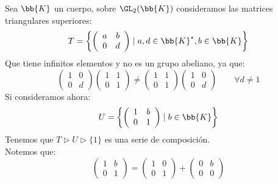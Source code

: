 \begin{ejemplo}
    Sea $\bb{K}$ un cuerpo, sobre $\GL_2(\bb{K})$ consideramos las matrices triangulares superiores:
    \begin{equation*}
        T = \left\{\left(\begin{array}{cc}
            a & b \\
            0 & d 
        \end{array}\right) \mid a,d\in \bb{K}^\ast, b\in \bb{K}\right\}
    \end{equation*}
    Que tiene infinitos elementos y no es un grupo abeliano, ya que:
    \begin{equation*}
        \left(\begin{array}{cc}
            1 & 0 \\
            0 & d 
        \end{array}\right)\left(\begin{array}{cc}
            1 & 1 \\
            0 & 1 
        \end{array}\right) \neq \left(\begin{array}{cc}
            1 & 1 \\
            0 & 1 
        \end{array}\right)\left(\begin{array}{cc}
            1 & 0 \\
            0 & d 
        \end{array}\right) \qquad \forall d\neq 1
    \end{equation*}
    Si consideramos ahora:
    \begin{equation*}
        U = \left\{\left(\begin{array}{cc}
            1 & b \\
            0 & 1 
        \end{array}\right) \mid b\in \bb{K}\right\}
    \end{equation*}
    Tenemos que $T\rhd U \rhd \{1\}$ es una serie de composición.\\

    \noindent
    Notemos que:
    \begin{equation*}
        \left(\begin{array}{cc}
            1 & b \\
            0 & 1 
        \end{array}\right) = \left(\begin{array}{cc}
            1 & 0 \\
            0 & 1 
        \end{array}\right) + \left(\begin{array}{cc}
            0 & b \\
            0 & 0 
        \end{array}\right)
    \end{equation*}


\end{ejemplo}
